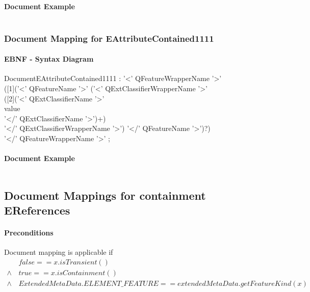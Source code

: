 \documentclass[11pt,a4paper]{article}
\begin{document}
\paragraph{Document Example}
\inputminted[fontsize=\footnotesize]{xml}{examples/EAttributeContained1110.xml}


\subsubsection{Document Mapping for EAttributeContained1111}
\paragraph{EBNF - Syntax Diagram}
\begin{rail}
DocumentEAttributeContained1111 : '<' QFeatureWrapperName '>' \\
([1]('<' QFeatureName '>'  ('<' QExtClassifierWrapperName '>'\\
([2]('<' QExtClassifierName '>'\\
 value \\
 '</' QExtClassifierName '>')+) \\
'</' QExtClassifierWrapperName '>') '</' QFeatureName '>')?) \\
'</' QFeatureWrapperName '>' ;
\end{rail}
\paragraph{Document Example}
\inputminted[fontsize=\footnotesize]{xml}{examples/EAttributeContained1111.xml}

\subsection{Document Mappings for containment EReferences}
\paragraph{Preconditions} 
Document mapping is applicable if
\begin{align*}
& \, false == x.isTransient()  \\
\wedge & \, true == x.isContainment() \\
\wedge & \,  ExtendedMetaData.ELEMENT\_FEATURE == extendedMetaData.getFeatureKind(x) \\
\end{align*}
\end{document}
